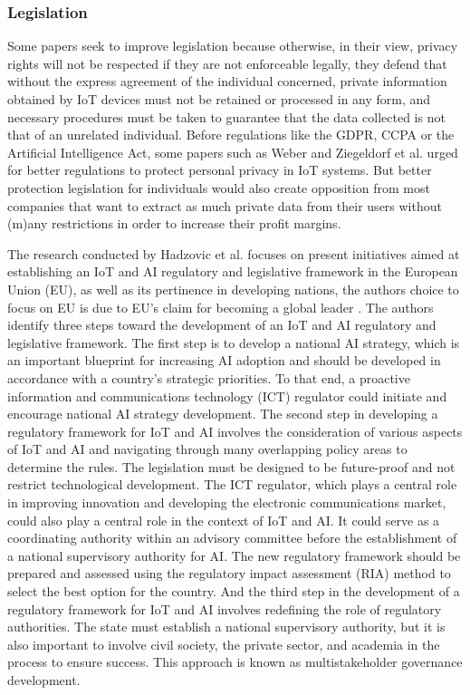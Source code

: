 \subsubsection{Legislation}

Some papers seek to improve legislation \cite{WEBER2015618, FabianoInternet}
because otherwise, in their view, privacy rights will not be respected if they
are not enforceable legally, they defend that without the express agreement
of the individual concerned, private information obtained by IoT devices
must not be retained or processed in any form, and necessary procedures
must be taken to guarantee that the data collected is not that of an unrelated
individual. Before regulations like the GDPR, CCPA or the Artificial Intelligence
Act, some papers such as Weber \cite{weber2010internet} and Ziegeldorf et al. \cite{ziegeldorf2014privacy}
urged for better regulations to protect personal privacy in IoT systems.
But better protection legislation for individuals would also create opposition
from most companies that want to extract as much private data from their
users without (m)any restrictions in order to increase their profit margins.

The research conducted by Hadzovic et al. \cite{hadzovic2023path} focuses on
present initiatives aimed at establishing an IoT and AI regulatory and legislative
framework in the European Union (EU), as well as its pertinence in developing nations, the authors
choice to focus on EU is due to EU's claim for becoming a global leader \cite{european2021europe}. The authors
identify three steps toward the development of an IoT and AI regulatory and
legislative framework. The first step is to develop a national AI strategy, which
is an important blueprint for increasing AI adoption and should be developed
in accordance with a country's strategic priorities. To that end, a proactive
information and communications technology (ICT) regulator could initiate and encourage
national AI strategy development. The second step in developing a regulatory
framework for IoT and AI involves the consideration of various aspects of IoT
and AI and navigating through many overlapping policy areas to determine the rules.
The legislation must be designed to be future-proof and not restrict technological
development. The ICT regulator, which plays a central role in improving innovation
and developing the electronic communications market, could also play a central role
in the context of IoT and AI. It could serve as a coordinating authority within
an advisory committee before the establishment of a national supervisory authority
for AI. The new regulatory framework should be prepared and assessed using the regulatory
impact assessment (RIA) method to select the best option for the country. And the
third step in the development of a regulatory framework for IoT and AI involves
redefining the role of regulatory authorities. The state must establish a national
supervisory authority, but it is also important to involve civil society, the private
sector, and academia in the process to ensure success. This approach is known as
multistakeholder governance development.

